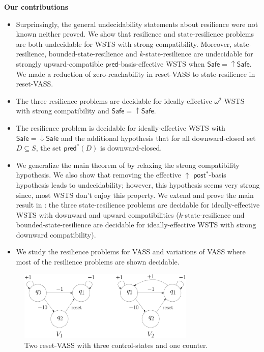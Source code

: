 \documentclass[runningheads]{llncs}
\newcommand{\pred}{\textsf{pred}}
\newcommand{\post}{\textsf{post}}
\newcommand{\Safe}{\textsf{Safe}}
\begin{document}
\noindent
{\bf Our contributions}
\begin{itemize}
\item Surprinsingly, the general undecidability statements about resilience were not known neither proved. We show that resilience and {state-resilience} problems are both undecidable for WSTS with strong compatibility. 
Moreover, {state-resilience},
{bounded-state-resilience} and
{$k$-state-resilience}
are undecidable for strongly upward-compatible $\pred$-basis-effective WSTS
when
$\Safe=\mathop{\uparrow} \Safe$. We made a reduction of zero-reachability in reset-VASS to {state-resilience} in reset-VASS.


\item The three resilience problems are decidable for ideally-effective $\omega^2$-WSTS with strong compatibility and $\Safe = \mathop{\uparrow} \Safe$.


\item The resilience problem is decidable for ideally-effective WSTS with 
$\Safe=\mathop{\downarrow} \Safe$
and
the additional hypothesis that
for all downward-closed set $D \subseteq S$, the set $\pred^*(D)$ is downward-closed.
%

\item We generalize the main theorem of \cite{DBLP:journals/corr/abs-2108-00889,DBLP:conf/gg/Ozkan22} by relaxing the  strong compatibility hypothesis.
We also show that removing the effective 
$\mathop{\uparrow}$ $\post^*$-basis hypothesis leads to undecidability; however, this hypothesis seems very strong since, most WSTS don't enjoy this property. We extend and prove the main result in  \cite{DBLP:journals/corr/PrasadZ16} : the three state-resilience problems are decidable for ideally-effective WSTS with downward and upward compatibilities ({$k$-state-resilience} and {bounded-state-resilience} are decidable for ideally-effective WSTS with strong downward compatibility).
%

\item We study the resilience problems for VASS and variations of VASS where most of the resilience problems are shown decidable.
\end{itemize}


 \begin{center}
	\begin{figure}
			\hspace{0.8cm}
\includegraphics[width=0.75\textwidth]{FigureCD}
	\caption{Two reset-VASS with three control-states and one counter.}
					\label{r-V}
	\end{figure}
\end{center}
\end{document}
